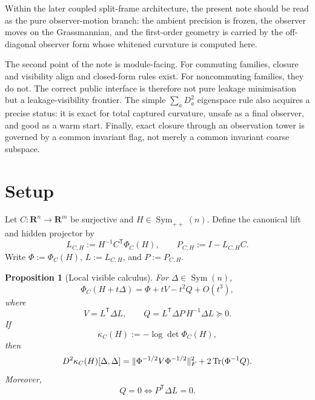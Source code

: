 \documentclass[11pt,a4paper]{article}
\numberwithin{equation}{section}
\DeclareMathOperator{\Tr}{Tr}
\DeclareMathOperator{\Sym}{Sym}
\DeclarePairedDelimiter{\norm}{\lVert}{\rVert}
\newcommand{\R}{\mathbf R}
\theoremstyle{thmcompact}
\newtheorem{proposition}[theorem]{Proposition}
\theoremstyle{remark}
\begin{document}
Within the later coupled split-frame architecture, the present note should be read as the pure observer-motion branch: the ambient precision is frozen, the observer moves on the Grassmannian, and the first-order geometry is carried by the off-diagonal observer form whose whitened curvature is computed here.

The second point of the note is module-facing. For commuting families, closure and visibility align and closed-form rules exist. For noncommuting families, they do not. The correct public interface is therefore not pure leakage minimisation but a leakage-visibility frontier. The simple $\sum_a D_a^2$ eigenspace rule also acquires a precise status: it is exact for total captured curvature, unsafe as a final observer, and good as a warm start. Finally, exact closure through an observation tower is governed by a common invariant flag, not merely a common invariant coarse subspace.

\section{Setup}

Let $C:\R^n\to\R^m$ be surjective and $H\in\Sym_{++}(n)$. Define the canonical lift and hidden projector by
\begin{equation}
L_{C,H}:=H^{-1}C^{\mathsf T}\Phi_C(H),
\qquad
P_{C,H}:=I-L_{C,H}C.
\label{eq:lift-projector}
\end{equation}
Write $\Phi:=\Phi_C(H)$, $L:=L_{C,H}$, and $P:=P_{C,H}$.

\begin{proposition}[Local visible calculus]
\label{prop:local-calculus}
For $\Delta\in\Sym(n)$,
\begin{equation}
\Phi_C(H+t\Delta)=\Phi+tV-t^2Q+O(t^3),
\label{eq:local-expansion}
\end{equation}
where
\begin{equation}
V=L^{\mathsf T}\Delta L,
\qquad
Q=L^{\mathsf T}\Delta P\,H^{-1}\Delta L\succeq 0.
\label{eq:VQ-def}
\end{equation}
If
\begin{equation}
\kappa_C(H):=-\log\det\Phi_C(H),
\label{eq:kappa-def}
\end{equation}
then
\begin{equation}
D^2\kappa_C(H)[\Delta,\Delta]
=
\norm{\Phi^{-1/2}V\Phi^{-1/2}}_F^2+2\Tr(\Phi^{-1}Q).
\label{eq:det-split}
\end{equation}
Moreover,
\begin{equation}
Q=0
\iff
P^{\mathsf T}\Delta L=0.
\label{eq:Q-vanish-general}
\end{equation}
\end{proposition}
\end{document}
